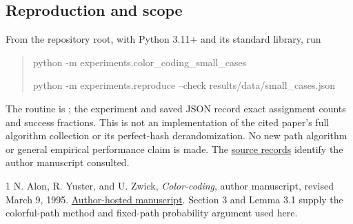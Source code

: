 \documentclass[10pt,letterpaper]{article}
\begin{document}
\subsection*{Reproduction and scope}
From the repository root, with Python 3.11+ and its standard library, run
\begin{quote}\small\ttfamily
python -m experiments.color\_coding\_small\_cases\par
python -m experiments.reproduce --check results/data/small\_cases.json
\end{quote}
The routine is ; the experiment and saved JSON
record exact assignment counts and success fractions. This is not an
implementation of the cited paper's full algorithm collection or its
perfect-hash derandomization. No new path algorithm or general empirical
performance claim is made. The
\href{https://github.com/Akhil-rav/discrete-math-lab/blob/main/notes/literature/source_records.md}{source records}
identify the author manuscript consulted.

\begin{thebibliography}{1}
 N. Alon, R. Yuster, and U. Zwick, \emph{Color-coding},
author manuscript, revised March 9, 1995.
\href{https://www.math.tau.ac.il/~nogaa/PDFS/col5.pdf}{Author-hosted manuscript}.
Section 3 and Lemma 3.1 supply the colorful-path method and fixed-path
probability argument used here.
\end{thebibliography}
\end{document}
